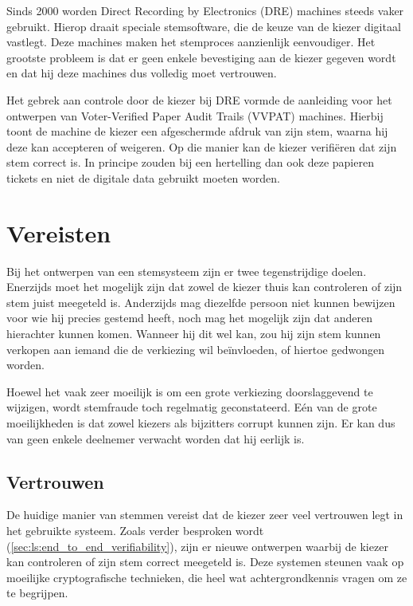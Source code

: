 \npar Sinds 2000 worden Direct Recording by Electronics (DRE) machines steeds vaker gebruikt. Hierop draait speciale stemsoftware, die de keuze van de kiezer digitaal vastlegt. Deze machines maken het stemproces aanzienlijk eenvoudiger. Het grootste probleem is dat er geen enkele bevestiging aan de kiezer gegeven wordt en dat hij deze machines dus volledig moet vertrouwen.\cite{wiki:dre_voting_machine}

\npar Het gebrek aan controle door de kiezer bij DRE vormde de aanleiding voor het ontwerpen van Voter-Verified Paper Audit Trails (VVPAT) machines. Hierbij toont de machine de kiezer een afgeschermde afdruk van zijn stem, waarna hij deze kan accepteren of weigeren. Op die manier kan de kiezer verifi\"eren dat zijn stem correct is. In principe zouden bij een hertelling dan ook deze papieren tickets en niet de digitale data gebruikt moeten worden.\cite{wiki:vvpat}

\section{Vereisten}
\label{sec:ls:vereisten}

Bij het ontwerpen van een stemsysteem zijn er twee tegenstrijdige doelen. Enerzijds moet het mogelijk zijn dat zowel de kiezer thuis kan controleren of zijn stem juist meegeteld is. Anderzijds mag diezelfde persoon niet kunnen bewijzen voor wie hij precies gestemd heeft, noch mag het mogelijk zijn dat anderen hierachter kunnen komen. Wanneer hij dit wel kan, zou hij zijn stem kunnen verkopen aan iemand die de verkiezing wil beïnvloeden, of hiertoe gedwongen worden.

\npar Hoewel het vaak zeer moeilijk is om een grote verkiezing doorslaggevend te wijzigen, wordt stemfraude toch regelmatig geconstateerd.\cite{adida_advances_in_cryptographic_voting_systems} E\'en van de grote moeilijkheden is dat zowel kiezers als bijzitters corrupt kunnen zijn. Er kan dus van geen enkele deelnemer verwacht worden dat hij eerlijk is.

\subsection{Vertrouwen}
\label{sec:ls:vertrouwen}

De huidige manier van stemmen vereist dat de kiezer zeer veel vertrouwen legt in het gebruikte systeem. Zoals verder besproken wordt (\ref{sec:ls:end_to_end_verifiability}), zijn er nieuwe ontwerpen waarbij de kiezer kan controleren of zijn stem correct meegeteld is. Deze systemen steunen vaak op moeilijke cryptografische technieken, die heel wat achtergrondkennis vragen om ze te begrijpen.

